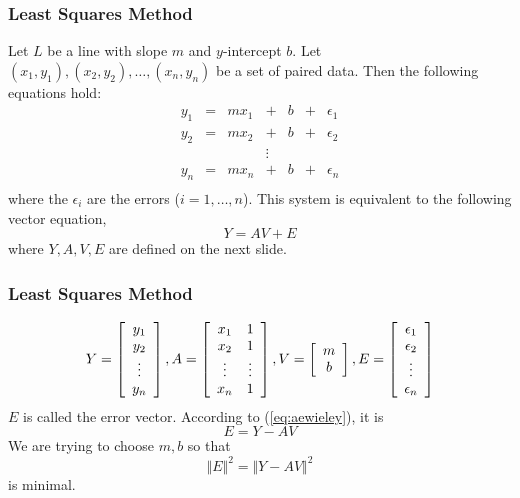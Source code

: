 \documentclass[xcolor=dvipsnames]{beamer}
\begin{document}
\begin{frame}
  \frametitle{Least Squares Method}
  Let $L$ be a line with slope $m$ and $y$-intercept $b$. Let
  $(x_{1},y_{1}),(x_{2},y_{2}),{\ldots},(x_{n},y_{n})$ be a set of
  paired data. Then the following equations hold:
  \begin{equation}
    \label{eq:cheexame}
    \begin{array}{ccccccc}
      y_{1}&=&mx_{1}&+&b&+&\epsilon_{1} \\
      y_{2}&=&mx_{2}&+&b&+&\epsilon_{2} \\
      &&&{\vdots}&&& \\
      y_{n}&=&mx_{n}&+&b&+&\epsilon_{n} \\
    \end{array}
  \end{equation}
where the $\epsilon_{i}$ are the errors ($i=1,{\ldots},n$). This
system is equivalent to the following vector equation,
\begin{equation}
  \label{eq:aewieley}
  Y=AV+E
\end{equation}
where $Y,A,V,E$ are defined on the next slide.
\end{frame}

\begin{frame}
  \frametitle{Least Squares Method}
  \begin{equation}
    \label{eq:aikaewah}
    Y=\left[
      \begin{array}{cc}
        y_{1}  \\
        y_{2}  \\
        {\vdots} \\
        y_{n}  
      \end{array}\right],
    A=\left[
      \begin{array}{cc}
        x_{1} & 1 \\
        x_{2} & 1 \\
        {\vdots} & {\vdots} \\
        x_{n} & 1
      \end{array}\right],
    V=\left[
      \begin{array}{cc}
        m  \\
        b  
      \end{array}\right],
    E=\left[
      \begin{array}{cc}
        \epsilon_{1}  \\
        \epsilon_{2}  \\
        {\vdots} \\
        \epsilon_{n}  
      \end{array}\right]\notag
  \end{equation}
  $E$ is called the error vector. According to (\ref{eq:aewieley}), it
  is
  \begin{equation}
    \label{eq:keebiero}
    E=Y-AV
  \end{equation}
  We are trying to choose $m,b$ so that
  \begin{equation}
    \label{eq:phugeyai}
    \Vert{}E\Vert^{2}=\Vert{}Y-AV\Vert^{2}
  \end{equation}
is minimal.
\end{frame}
\end{document}
